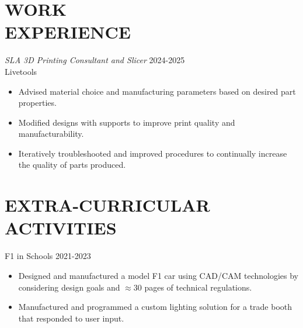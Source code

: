 \documentclass[margin, 10pt]{res} %
\begin{document}
\begin{resume}
\begin{itemize}
\end{itemize}
 
 
\section{WORK\\EXPERIENCE}

{\sl SLA 3D Printing Consultant and Slicer} \hfill 2024-2025 \\
Livetools

\begin{itemize} \itemsep -2pt %
\item Advised material choice and manufacturing parameters based on desired part properties.
\item Modified designs with supports to improve print quality and manufacturability.
\item Iteratively troubleshooted and improved procedures to continually increase the quality of parts produced.
\end{itemize}
 

\section{EXTRA-CURRICULAR \\ ACTIVITIES} 

 F1 in Schools \hfill 2021-2023
 \begin{itemize}
 	\item Designed and manufactured a model F1 car using CAD/CAM technologies by considering design goals and $\approx$30 pages of technical regulations.
 	\item Manufactured and programmed a custom lighting solution for a trade booth that responded to user input.
 \end{itemize}


\end{resume}
\end{document}
